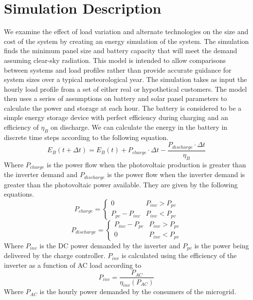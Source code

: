 \documentclass[conference]{IEEEtran}
\newcommand{\ppv}{P_{pv}}
\newcommand{\pinv}{P_{inv}}
\begin{document}
\section{Simulation Description}

We examine the effect of load variation and alternate technologies
on the size and cost of the system by creating an
energy simulation of the system.
The simulation finds the minimum panel size and battery capacity
that will meet the demand assuming clear-sky radiation.
This model is intended to allow comparisons between systems and
load profiles rather than provide accurate guidance for system
sizes over a typical meteorological year.
The simulation takes as input the hourly load profile from a
set of either real or hypothetical customers.
The model then uses a series of assumptions on battery and solar
panel parameters to calculate the power and storage at each hour.
The battery is considered to be a simple energy storage device
with perfect efficiency during charging and an efficiency of
$\eta_B$ on discharge.
We can calculate the energy in the battery in discrete time
steps according to the following equation.
%
$$ E_B(t+\Delta t) = E_B(t)
                   + P_{charge} \cdot \Delta t
                   - \frac{P_{discharge} \cdot \Delta t}{\eta_B}
                   $$
%
Where $P_{charge}$ is the power flow when the photovoltaic
production is greater than the inverter demand and
$P_{discharge}$ is the power flow when the inverter demand
is greater than the photovoltaic power available.
They are given by the following equations.
%
$$ P_{charge} = \left\{
			  \begin{array}{rl}
			  0 & \pinv > \ppv \\
			  \ppv - \pinv & \pinv < \ppv
			  \end{array}
			  \right. $$
%
$$ P_{discharge} = \left\{
			  \begin{array}{rl}
			  \pinv - \ppv & \pinv > \ppv \\
			  0 & \pinv < \ppv
			  \end{array}
			  \right. $$
%
Where $\pinv$ is the DC power demanded by the inverter and
$\ppv$ is the power being delivered by the charge controller.
$\pinv$ is calculated using the efficiency
of the inverter as a function of AC load according to
$$ \pinv = \frac{P_{AC}}{\eta_{inv}(P_{AC})} $$
%
Where $P_{AC}$ is the hourly power demanded by the consumers of the microgrid.
\end{document}
